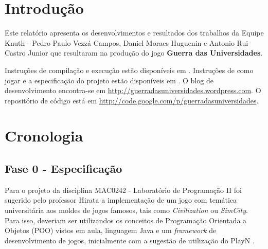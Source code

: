 \documentclass[brazil,times]{abnt}
\begin{document}





\data{\today}

\capa

\folhaderosto

\tableofcontents

\chapter{Introdução}
Este relatório apresenta os desenvolvimentos e resultados dos trabalhos da
Equipe Knuth - Pedro Paulo Vezzá Campos, Daniel Moraes Huguenin e Antonio Rui
Castro Junior que resultaram na produção do jogo \textbf{Guerra das
Universidades}.

Instruções de compilação e execução estão disponíveis em
\cite{compilacao-execucao}. Instruções de como jogar e a especificação do
projeto estão disponíveis em \cite{manual-usuario}. O blog de desenvolvimento
encontra-se em \url{http://guerradasuniversidades.wordpress.com}. O repositório
de código está em \url{http://code.google.com/p/guerradasuniversidades}.

\chapter{Cronologia}

\section{Fase 0 - Especificação}
Para o projeto da disciplina MAC0242 - Laboratório de Programação II foi
sugerido pelo professor Hirata a implementação de um jogo com temática
universitária aos moldes de jogos famosos, tais como \emph{Civilization} ou
\emph{SimCity}. Para isso, deveriam ser utilizandos os conceitos de Programação
Orientada a Objetos (POO) vistos em aula, linguagem Java e um \emph{framework}
de desenvolvimento de jogos, inicialmente com a sugestão de utilização do PlayN
\cite{playn}.
\end{document}
